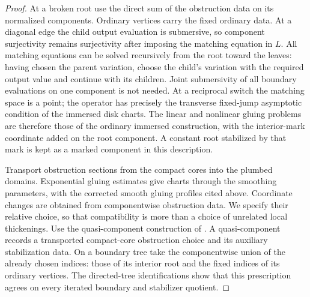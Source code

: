 \begin{proof}
At a broken root use the direct sum of the obstruction data on its
normalized components.  Ordinary vertices carry the fixed ordinary
data.  At a diagonal edge the child output evaluation is submersive,
so component surjectivity remains surjectivity after imposing the
matching equation in $L$.  All matching equations can be solved
recursively from the root toward the leaves: having chosen the
parent variation, choose the child's variation with the required
output value and continue with its children.  Joint submersivity
of all boundary evaluations on one component is not needed.
At a reciprocal switch the matching
space is a point; the operator has precisely the transverse
fixed-jump asymptotic condition of the immersed disk charts.
The linear and nonlinear gluing problems are therefore those of
the ordinary immersed construction, with the interior-mark
coordinate added on the root component.  A constant root
stabilized by that mark is kept as a marked component in this
description.

Transport obstruction sections from the compact cores into the
plumbed domains.  Exponential gluing estimates give charts through
the smoothing parameters, with the corrected smooth gluing
profiles cited above.  Coordinate changes are obtained from
componentwise obstruction data.  We specify their relative choice,
so that compatibility is more than a choice of unrelated local
thickenings.  Use the quasi-component construction of
\cite[Conditions~8.12--8.15, Lemmas~8.19--8.20, and
Definition~8.21]{FOOOChartsII}.  A quasi-component records a
transported compact-core obstruction choice and its auxiliary
stabilization data.  On a boundary tree take the componentwise
union of the already chosen indices: those of its interior root
and the fixed indices of its ordinary vertices.  The directed-tree
identifications show that this prescription agrees on every
iterated boundary and stabilizer quotient.


\end{proof}
